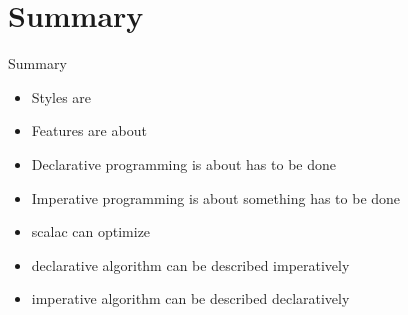\section{Summary}
\begin{frame}[fragile]{Summary}
\begin{itemize}
  \item Styles are 
  \item Features are about 
  \item Declarative programming is about  has to be done
  \item Imperative programming is about  something has to be done
  \item scalac can optimize 
  \item {} declarative algorithm can be described imperatively
  \item {} imperative algorithm can be described declaratively
\end{itemize}
\end{frame}